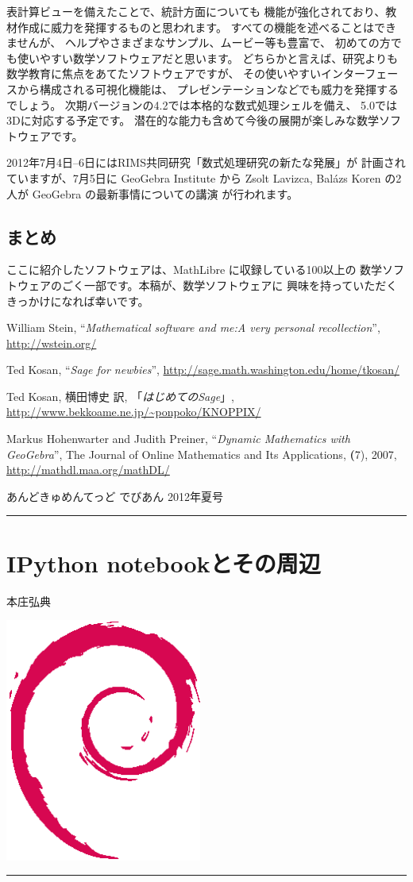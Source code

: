 \documentclass[mingoth,a4paper]{jsarticle}
\renewcommand{\dancersection}[2]{%
\newpage
あんどきゅめんてっど でびあん 2012年夏号
%
\vspace{0.1mm}\\
{\color{dancerdarkblue}\rule{\hsize}{2mm}}

%
%
\begin{minipage}[t]{0.6\hsize}
\color{dancerdarkblue}
\vspace{1cm}
\section{#1}
\hfill{}#2\\
\end{minipage}
\begin{minipage}[t]{0.4\hsize}
\vspace{-2cm}
\hfill{}\includegraphics[height=8cm]{image200502/openlogo-nd.eps}\\
\vspace{-5cm}
\end{minipage}
%
{\color{dancerlightblue}\rule{0.66\hsize}{2mm}}
%
\vspace{2cm}
}
\begin{document}
表計算ビューを備えたことで、統計方面についても
機能が強化されており、教材作成に威力を発揮するものと思われます。
すべての機能を述べることはできませんが、
ヘルプやさまざまなサンプル、ムービー等も豊富で、
初めての方でも使いやすい数学ソフトウェアだと思います。
どちらかと言えば、研究よりも数学教育に焦点をあてたソフトウェアですが、
その使いやすいインターフェースから構成される可視化機能は、
プレゼンテーションなどでも威力を発揮するでしょう。
次期バージョンの4.2では本格的な数式処理シェルを備え、
5.0では3Dに対応する予定です。
潜在的な能力も含めて今後の展開が楽しみな数学ソフトウェアです。

2012年7月4日--6日にはRIMS共同研究「数式処理研究の新たな発展」が
計画されていますが、7月5日に GeoGebra Institute から
Zsolt Lavizca, Bal\'azs Koren の2人が GeoGebra の最新事情についての講演
が行われます。

\subsection{まとめ}
ここに紹介したソフトウェアは、MathLibre に収録している100以上の
数学ソフトウェアのごく一部です。本稿が、数学ソフトウェアに
興味を持っていただくきっかけになれば幸いです。

\begin{thebibliography}{99}

William Stein,
``\emph{Mathematical software and me:A very personal recollection}'',
\url{http://wstein.org/}

Ted Kosan,
``\emph{Sage for newbies}'',
\url{http://sage.math.washington.edu/home/tkosan/}

Ted Kosan, 横田博史 訳,
「\emph{はじめてのSage}」,
\url{http://www.bekkoame.ne.jp/~ponpoko/KNOPPIX/}

Markus Hohenwarter and Judith Preiner,
``\emph{Dynamic Mathematics with GeoGebra}'',
The Journal of Online Mathematics and Its Applications,
\textbf(7), 2007, \url{http://mathdl.maa.org/mathDL/}
\end{thebibliography}



\dancersection{IPython notebookとその周辺}{本庄弘典}
\label{sec:ipython-notebook}
\end{document}

